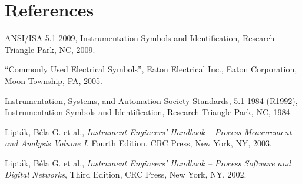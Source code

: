 







\filbreak
\section*{References}


\noindent
ANSI/ISA-5.1-2009, Instrumentation Symbols and Identification, Research Triangle Park, NC, 2009.

\vskip 10pt

\noindent
``Commonly Used Electrical Symbols'', Eaton Electrical Inc., Eaton Corporation, Moon Township, PA, 2005.

\vskip 10pt

\noindent
Instrumentation, Systems, and Automation Society Standards, 5.1-1984 (R1992), Instrumentation Symbols and Identification, Research Triangle Park, NC, 1984.

\vskip 10pt

\noindent
Lipt\'ak, B\'ela G. et al., \textit{Instrument Engineers' Handbook -- Process Measurement and Analysis Volume I}, Fourth Edition, CRC Press, New York, NY, 2003.

\vskip 10pt

\noindent
Lipt\'ak, B\'ela G. et al., \textit{Instrument Engineers' Handbook -- Process Software and Digital Networks}, Third Edition, CRC Press, New York, NY, 2002.


























